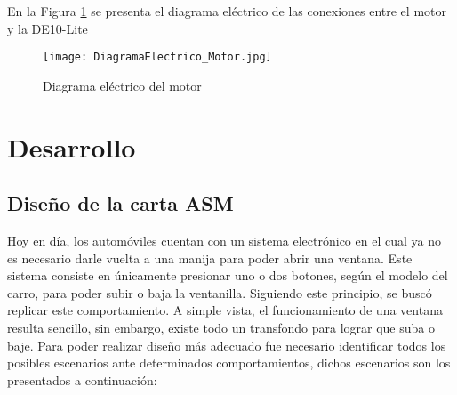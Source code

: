 \documentclass{article}
\begin{document}
En la Figura \ref{fig:DiagramaElectrico2} se presenta el diagrama eléctrico de las conexiones entre el motor y la DE10-Lite
\begin{figure}[h!]
        \centering
        \texttt{[image: DiagramaElectrico\_Motor.jpg]}
        \caption{\label{fig:DiagramaElectrico2}Diagrama eléctrico del motor}
    \end{figure}


\section{Desarrollo}
\subsection{Diseño de la carta ASM}
Hoy en día, los automóviles cuentan con un sistema electrónico en el cual ya no es necesario darle vuelta a una manija para poder abrir una ventana. Este sistema consiste en únicamente presionar uno o dos botones, según el modelo del carro, para poder subir o baja la ventanilla. Siguiendo este principio, se buscó replicar este comportamiento. A simple vista, el funcionamiento de una ventana resulta sencillo, sin embargo, existe todo un transfondo para lograr que suba o baje. Para poder realizar diseño más adecuado fue necesario identificar todos los posibles escenarios ante determinados comportamientos, dichos escenarios son los presentados a continuación:
\end{document}
